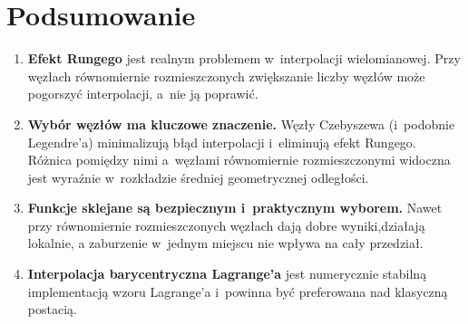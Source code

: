 \documentclass[12pt, a4paper]{article}
\begin{document}
\section{Podsumowanie}

\begin{enumerate}
  \item \textbf{Efekt Rungego} jest realnym problemem w~interpolacji
        wielomianowej. Przy węzłach równomiernie rozmieszczonych zwiększanie
        liczby węzłów może pogorszyć interpolacji, a~nie ją poprawić.

  \item \textbf{Wybór węzłów ma kluczowe znaczenie.} Węzły Czebyszewa
        (i~podobnie Legendre'a) minimalizują błąd interpolacji i~eliminują
        efekt Rungego. Różnica pomiędzy nimi a~węzłami równomiernie
        rozmieszczonymi widoczna jest wyraźnie w~rozkładzie średniej
        geometrycznej odległości.

  \item \textbf{Funkcje sklejane są bezpiecznym i~praktycznym wyborem.}
        Nawet przy równomiernie rozmieszczonych węzłach dają dobre
        wyniki,działają lokalnie, a zaburzenie w~jednym miejscu nie
        wpływa na cały przedział.

  \item \textbf{Interpolacja barycentryczna Lagrange'a} jest numerycznie
        stabilną implementacją wzoru Lagrange'a i~powinna być preferowana
        nad klasyczną postacią.
\end{enumerate}
\end{document}
